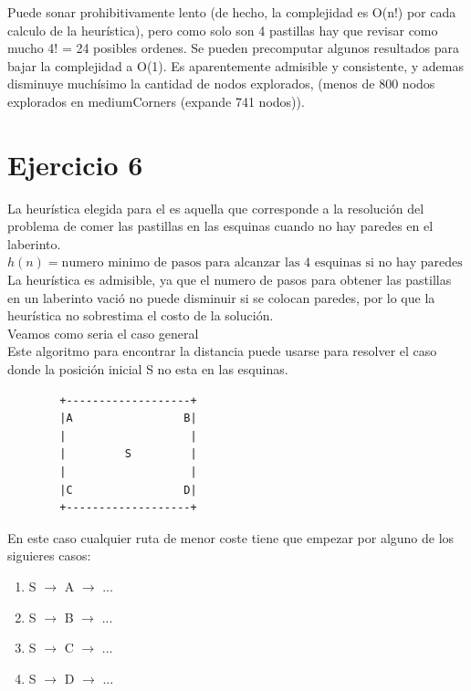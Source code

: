 \documentclass[12pt, titlepage, a4paper]{article}
\begin{document}
Puede sonar prohibitivamente lento (de hecho, la complejidad es O(n!) por cada calculo de la heurística), 
pero como solo son 4 pastillas hay que revisar como mucho 4! = 24 posibles ordenes. Se pueden precomputar 
algunos resultados para bajar la complejidad a O(1). 
Es aparentemente admisible y consistente, y ademas disminuye muchísimo la cantidad de nodos explorados, 
(menos de 800 nodos explorados en mediumCorners (expande 741 nodos)).

\section{Ejercicio 6}
La heurística elegida para el es aquella que corresponde a la
resolución del problema de comer las pastillas en las esquinas cuando no hay
paredes en el laberinto.\\

$h(n)= \text{numero minimo de pasos para alcanzar las 4 esquinas si no hay paredes}$\\

La heurística es admisible, ya que el numero de pasos para obtener las pastillas
en un laberinto vació no puede disminuir si se colocan paredes, por lo que la
heurística no sobrestima el costo de la solución.\\

\noindent Veamos como seria el caso general\\

Este algoritmo para encontrar la distancia puede usarse para resolver el caso
donde la posición inicial S no esta en las esquinas.

\begin{verbatim}
        +-------------------+
        |A                 B|
        |                   |
        |         S         |
        |                   |
        |C                 D|
        +-------------------+
\end{verbatim}


En este caso cualquier ruta de menor coste tiene que empezar por alguno de los
siguieres casos:
\begin{enumerate}
    \item {S $\rightarrow$ A $\rightarrow$ ...}
    \item {S $\rightarrow$ B $\rightarrow$ ...}
    \item {S $\rightarrow$ C $\rightarrow$ ...}
    \item {S $\rightarrow$ D $\rightarrow$ ...}
\end{enumerate}
\end{document}

